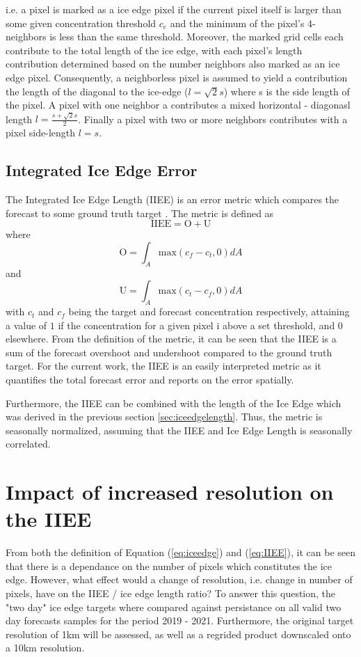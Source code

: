 \documentclass[../main/thesis.tex]{subfiles}
\begin{document}
i.e. a pixel is marked as a ice edge pixel if the current pixel itself is larger than some given concentration threshold $c_e$ and the minimum of the pixel's 4-neighbors is less than the same threshold. Moreover, the marked grid cells each contribute to the total length of the ice edge, with each pixel's length contribution determined based on the number neighbors also marked as an ice edge pixel. Consequently, a neighborless pixel is assumed to yield a contribution the length of the diagonal to the ice-edge ($l = \sqrt2s$) where s is the side length of the pixel. A pixel with one neighbor a contributes a mixed horizontal - diagonasl length $l = \frac{s + \sqrt2s}{2}$. Finally a pixel with two or more neighbors contributes with a pixel side-length $l = s$.

\subsection{Integrated Ice Edge Error}
The Integrated Ice Edge Length (IIEE) is an error metric which compares the forecast to some ground truth target \cite{Goessling2016}. The metric is defined as 
\begin{equation}
    \label{eq:IIEE}
    \text{IIEE} = \text{O} + \text{U}
\end{equation}
where 
\begin{equation}
    \text{O} = \int_A\text{max}(c_f - c_t, 0)dA
\end{equation}
and
\begin{equation}
    \text{U} = \int_A\text{max}(c_t - c_f, 0)dA
\end{equation}
with $c_t$ and $c_f$ being the target and forecast concentration respectively, attaining a value of $1$ if the concentration for a given pixel i above a set threshold, and 0 elsewhere. From the definition of the metric, it can be seen that the IIEE is a sum of the forecast overshoot and undershoot compared to the ground truth target. For the current work, the IIEE is an easily interpreted metric as it quantifies the total forecast error and reports on the error spatially. 

Furthermore, the IIEE can be combined with the length of the Ice Edge which was derived in the previous section \ref{sec:iceedgelength}. Thus, the metric is seasonally normalized, assuming that the IIEE and Ice Edge Length is seasonally correlated.

\section{Impact of increased resolution on the IIEE}
From both the definition of Equation (\ref{eq:iceedge}) and (\ref{eq:IIEE}), it can be seen that there is a dependance on the number of pixels which constitutes the ice edge. However, what effect would a change of resolution, i.e. change in number of pixels, have on the IIEE / ice edge length ratio? To answer this question, the "two day" ice edge targets where compared against persistance on all valid two day forecasts samples for the period 2019 - 2021. Furthermore, the original target resolution of 1km will be assessed, as well as a regrided product downscaled onto a 10km resolution.
\end{document}
